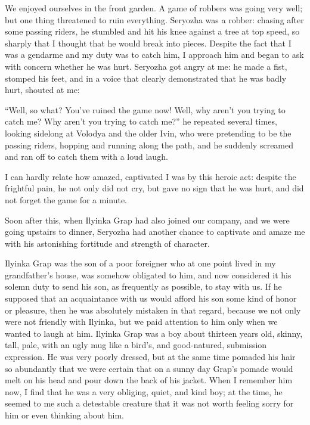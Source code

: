 We enjoyed ourselves in the front garden. A game of robbers was going very well; but one thing threatened to ruin everything. Seryozha was a robber: chasing after some passing riders, he stumbled and hit his knee against a tree at top speed, so sharply that I thought that he would break into pieces. Despite the fact that I was a gendarme and my duty was to catch him, I approach him and began to ask with concern whether he was hurt. Seryozha got angry at me: he made a fist, stomped his feet, and in a voice that clearly demonstrated that he was badly hurt, shouted at me:

``Well, so what? You've ruined the game now! Well, why aren't you trying to catch me? Why aren't you trying to catch me?'' he repeated several times, looking sidelong at Volodya and the older Ivin, who were pretending to be the passing riders, hopping and running along the path, and he suddenly screamed and ran off to catch them with a loud laugh.

I can hardly relate how amazed, captivated I was by this heroic act: despite the frightful pain, he not only did not cry, but gave no sign that he was hurt, and did not forget the game for a minute.

Soon after this, when Ilyinka Grap had also joined our company, and we were going upstairs to dinner, Seryozha had another chance to captivate and amaze me with his astonishing fortitude and strength of character.

Ilyinka Grap was the son of a poor foreigner who at one point lived in my grandfather's house, was somehow obligated to him, and now considered it his solemn duty to send his son, as frequently as possible, to stay with us. If he supposed that an acquaintance with us would afford his son some kind of honor or pleasure, then he was absolutely mistaken in that regard, because we not only were not friendly with Ilyinka, but we paid attention to him only when we wanted to laugh at him. Ilyinka Grap was a boy about thirteen years old, skinny, tall, pale, with an ugly mug like a bird's, and good-natured, submission expression. He was very poorly dressed, but at the same time pomaded his hair so abundantly that we were certain that on a sunny day Grap's pomade would melt on his head and pour down the back of his jacket. When I remember him now, I find that he was a very obliging, quiet, and kind boy; at the time, he seemed to me such a detestable creature that it was not worth feeling sorry for him or even thinking about him.

